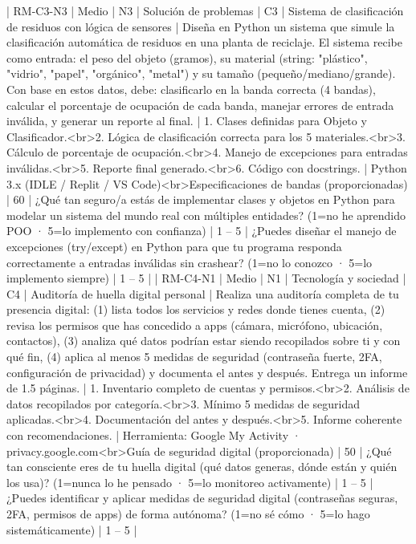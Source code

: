 | RM-C3-N3 | Medio | N3 | Solución de problemas | C3 | Sistema de clasificación de residuos con lógica de sensores | Diseña en Python un sistema que simule la clasificación automática de residuos en una planta de reciclaje. El sistema recibe como entrada: el peso del objeto (gramos), su material (string: "plástico", "vidrio", "papel", "orgánico", "metal") y su tamaño (pequeño/mediano/grande). Con base en estos datos, debe: clasificarlo en la banda correcta (4 bandas), calcular el porcentaje de ocupación de cada banda, manejar errores de entrada inválida, y generar un reporte al final. | 1. Clases definidas para Objeto y Clasificador.<br>2. Lógica de clasificación correcta para los 5 materiales.<br>3. Cálculo de porcentaje de ocupación.<br>4. Manejo de excepciones para entradas inválidas.<br>5. Reporte final generado.<br>6. Código con docstrings. | Python 3.x (IDLE / Replit / VS Code)<br>Especificaciones de bandas (proporcionadas) | 60 | ¿Qué tan seguro/a estás de implementar clases y objetos en Python para modelar un sistema del mundo real con múltiples entidades? (1=no he aprendido POO · 5=lo implemento con confianza) | 1 – 5 | ¿Puedes diseñar el manejo de excepciones (try/except) en Python para que tu programa responda correctamente a entradas inválidas sin crashear? (1=no lo conozco · 5=lo implemento siempre) | 1 – 5 |
| RM-C4-N1 | Medio | N1 | Tecnología y sociedad | C4 | Auditoría de huella digital personal | Realiza una auditoría completa de tu presencia digital: (1) lista todos los servicios y redes donde tienes cuenta, (2) revisa los permisos que has concedido a apps (cámara, micrófono, ubicación, contactos), (3) analiza qué datos podrían estar siendo recopilados sobre ti y con qué fin, (4) aplica al menos 5 medidas de seguridad (contraseña fuerte, 2FA, configuración de privacidad) y documenta el antes y después. Entrega un informe de 1.5 páginas. | 1. Inventario completo de cuentas y permisos.<br>2. Análisis de datos recopilados por categoría.<br>3. Mínimo 5 medidas de seguridad aplicadas.<br>4. Documentación del antes y después.<br>5. Informe coherente con recomendaciones. | Herramienta: Google My Activity · privacy.google.com<br>Guía de seguridad digital (proporcionada) | 50 | ¿Qué tan consciente eres de tu huella digital (qué datos generas, dónde están y quién los usa)? (1=nunca lo he pensado · 5=lo monitoreo activamente) | 1 – 5 | ¿Puedes identificar y aplicar medidas de seguridad digital (contraseñas seguras, 2FA, permisos de apps) de forma autónoma? (1=no sé cómo · 5=lo hago sistemáticamente) | 1 – 5 |
